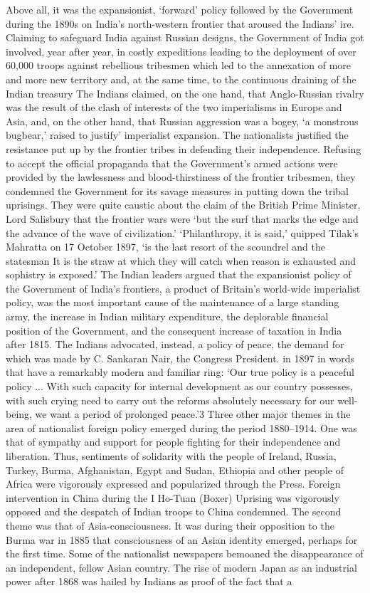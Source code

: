 \begin{multicols}{2}
Above all, it was the expansionist, `forward' policy followed by the Government during the 1890s on India's north-western frontier that aroused the Indians' ire. Claiming to safeguard India against Russian designs, the Government of India got involved, year after year, in costly expeditions leading to the deployment of over 60,000 troops against rebellious tribesmen which led to the annexation of more and more new territory and, at the same time, to the continuous draining of the Indian treasury The Indians claimed, on the one hand, that Anglo-Russian rivalry was the result of the clash of interests of the two imperialisms in Europe and Asia, and, on the other hand, that Russian aggression was a bogey, `a monstrous bugbear,' raised to justify' imperialist expansion. The nationalists justified the resistance put up by the frontier tribes in defending their independence. Refusing to accept the official propaganda that the Government's armed actions were provided by the lawlessness and blood-thirstiness of the frontier tribesmen, they condemned the Government for its savage measures in putting down the tribal uprisings. They were quite caustic about the claim of the British Prime Minister, Lord Salisbury that the frontier wars were `but the surf that marks the edge and the advance of the wave of civilization.' `Philanthropy, it is said,' quipped Tilak's Mahratta on 17 October 1897, `is the last resort of the scoundrel and the statesman It is the straw at which they will catch when reason is exhausted and sophistry is exposed.' The Indian leaders argued that the expansionist policy of the Government of India's frontiers, a product of Britain's world-wide imperialist policy, was the most important cause of the maintenance of a large standing army, the increase in Indian military expenditure, the deplorable financial position of the Government, and the consequent increase of taxation in India after 1815. The Indians advocated, instead, a policy of peace, the demand for which was made by C. Sankaran Nair, the Congress President. in 1897 in words that have a remarkably modern and familiar ring: `Our true policy is a peaceful policy ... With such capacity for internal development as our country possesses, with such crying need to carry out the reforms absolutely necessary for our well-being, we want a period of prolonged peace.'3 Three other major themes in the area of nationalist foreign policy emerged during the period 1880--1914. One was that of sympathy and support for people fighting for their independence and liberation. Thus, sentiments of solidarity with the people of Ireland, Russia, Turkey, Burma, Afghanistan, Egypt and Sudan, Ethiopia and other people of Africa were vigorously expressed and popularized through the Press. Foreign intervention in China during the I Ho-Tuan (Boxer) Uprising was vigorously opposed and the despatch of Indian troops to China condemned. The second theme was that of Asia-consciousness. It was during their opposition to the Burma war in 1885 that consciousness of an Asian identity emerged, perhaps for the first time. Some of the nationalist newspapers bemoaned the disappearance of an independent, fellow Asian country. The rise of modern Japan as an industrial power after 1868 was hailed by Indians as proof of the fact that a 
\end{multicols}
